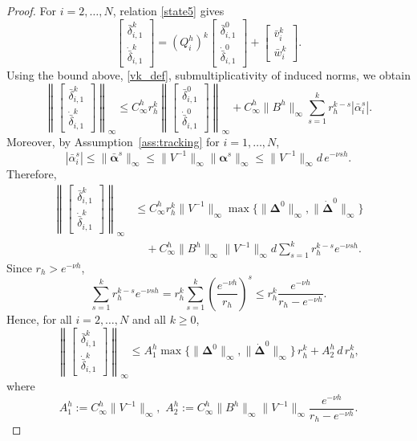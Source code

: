 \documentclass[10pt,a4paper]{amsart}
\begin{document}
\begin{proof}
For \(i=2,\dots,N\), relation \eqref{state5} gives
\[
\begin{bmatrix}
\bar{\delta}_{i,1}^k \\[5pt]
\dot{\bar{\delta}}_{i,1}^k
\end{bmatrix}
=
(Q_i^h)^k
\begin{bmatrix}
\bar{\delta}_{i,1}^{0} \\[5pt]
\dot{\bar{\delta}}_{i,1}^{0}
\end{bmatrix}
+
\begin{bmatrix}
\bar{v}_i^k \\[5pt]
\bar{w}_i^k
\end{bmatrix}.
\]
Using the bound above, \eqref{vk_def}, submultiplicativity of induced norms, we obtain
\[
\left\|
\begin{bmatrix}
\bar{\delta}_{i,1}^k \\[5pt]
\dot{\bar{\delta}}_{i,1}^k
\end{bmatrix}
\right\|_\infty
\le
C_\infty^h r_h^k
\left\|
\begin{bmatrix}
\bar{\delta}_{i,1}^{0} \\[5pt]
\dot{\bar{\delta}}_{i,1}^{0}
\end{bmatrix}
\right\|_\infty
+
C_\infty^h\|B^h\|_\infty
\sum_{s=1}^{k}
r_h^{k-s}|\bar{\alpha}_i^s|.
\]
Moreover, by  Assumption~\ref{ass:tracking} for \(i=1,\dots,N\),
\[
|\bar{\alpha}_i^s|
\le \|\bar{\bm{\alpha}}^s\|_\infty
\le \|V^{-1}\|_\infty \|\bm{\alpha}^s\|_\infty
\le \|V^{-1}\|_\infty d\,e^{-\nu sh}.
\]
Therefore,
\[
\begin{split}
\left\|
\begin{bmatrix}
\bar{\delta}_{i,1}^k \\[5pt]
\dot{\bar{\delta}}_{i,1}^k
\end{bmatrix}
\right\|_\infty
&\le
C_\infty^h r_h^k \|V^{-1}\|_\infty
\max\{\|\bm{\Delta}^0\|_\infty,\|\dot{\bm{\Delta}}^0\|_\infty\}
\\
&\quad+
C_\infty^h\|B^h\|_\infty \|V^{-1}\|_\infty d
\sum_{s=1}^{k}
r_h^{k-s}e^{-\nu sh}.
\end{split}
\]
Since \(r_h>e^{-\nu h}\),
\[
\sum_{s=1}^{k}
r_h^{k-s}e^{-\nu sh}
=
r_h^k\sum_{s=1}^{k}\left(\frac{e^{-\nu h}}{r_h}\right)^s
\le
r_h^k\frac{e^{-\nu h}}{r_h-e^{-\nu h}}.
\]
Hence, for all \(i=2,\dots,N\) and all \(k\ge 0\),
\begin{equation}\label{eq:disagreement_mode_bound}
\left\|
\begin{bmatrix}
\bar{\delta}_{i,1}^k \\[5pt]
\dot{\bar{\delta}}_{i,1}^k
\end{bmatrix}
\right\|_\infty
\le
A_1^h
\max\{\|\bm{\Delta}^0\|_\infty,\|\dot{\bm{\Delta}}^0\|_\infty\}\,r_h^k
+
A_2^h\, d\, r_h^k,
\end{equation}
where
\[
A_1^h:=C_\infty^h\|V^{-1}\|_\infty,
\,\,
A_2^h:=C_\infty^h\|B^h\|_\infty \|V^{-1}\|_\infty
\frac{e^{-\nu h}}{r_h-e^{-\nu h}}.
\]


\end{proof}
\end{document}

